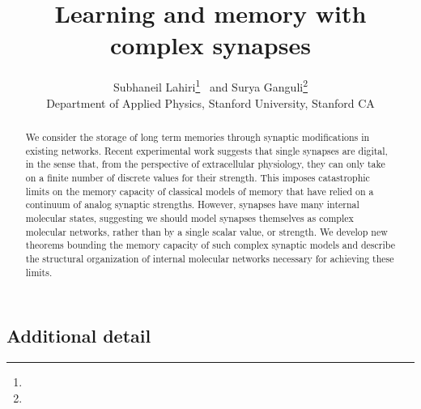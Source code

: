 \documentclass[12pt]{article}
\title{Learning and memory with complex synapses}
\author{Subhaneil Lahiri\thanks{\emaillink{sulahiri@stanford.edu}}~ and Surya Ganguli\thanks{\emaillink{sganguli@stanford.edu}}\\
%
\small{
Department of Applied Physics, Stanford University, Stanford CA
}
}
\begin{document}
\maketitle




\begin{abstract}
  We consider the storage of long term memories through synaptic modifications in existing networks. Recent experimental work suggests that single synapses are digital, in the sense that, from the perspective of extracellular physiology, they can only take on a finite number of discrete values for their strength. This imposes catastrophic limits on the memory capacity of classical models of memory that have relied on a continuum of analog synaptic strengths. However, synapses have many internal molecular states, suggesting we should model synapses themselves as complex molecular networks, rather than by a single scalar value, or strength. We develop new theorems bounding the memory capacity of such complex synaptic models and describe the structural organization of internal molecular networks necessary for achieving these limits. 
\end{abstract}

\subsection*{Additional detail}





%
%
\end{document}
